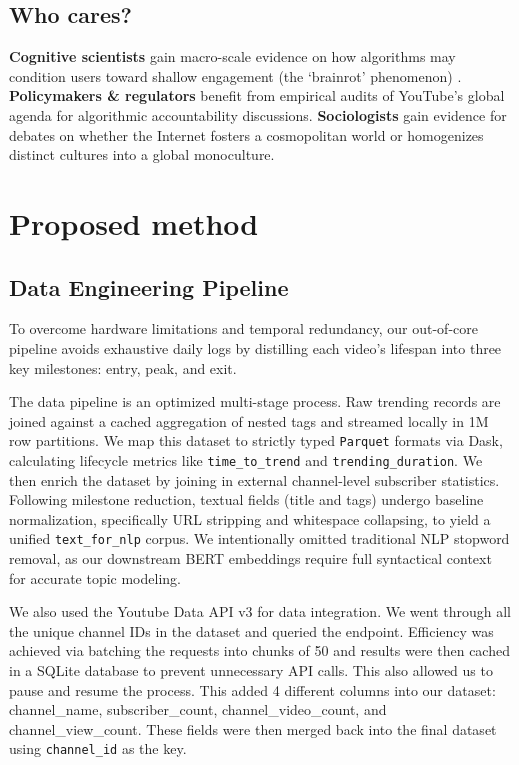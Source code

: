 \documentclass[sigconf,11pt]{acmart}
\begin{document}
\subsection{Who cares?}
\textbf{Cognitive scientists} gain macro-scale evidence on how algorithms may condition users toward shallow engagement (the `brainrot' phenomenon) \cite{10457053}. \textbf{Policymakers \& regulators} benefit from empirical audits of YouTube's global agenda for algorithmic accountability discussions. \textbf{Sociologists} gain evidence for debates on whether the Internet fosters a cosmopolitan world or homogenizes distinct cultures into a global monoculture.


\section{Proposed method}

\subsection{Data Engineering Pipeline}
To overcome hardware limitations and temporal redundancy, our out-of-core pipeline avoids exhaustive daily logs by distilling each video's lifespan into three key milestones: entry, peak, and exit. 

The data pipeline is an optimized multi-stage process. Raw trending records are joined against a cached aggregation of nested tags and streamed locally in 1M row partitions. We map this dataset to strictly typed \texttt{Parquet} formats via Dask, calculating lifecycle metrics like \texttt{time\_to\_trend} and \texttt{trending\_duration}. We then enrich the dataset by joining in external channel-level subscriber statistics. Following milestone reduction, textual fields (title and tags) undergo baseline normalization, specifically URL stripping and whitespace collapsing, to yield a unified \texttt{text\_for\_nlp} corpus. We intentionally omitted traditional NLP stopword removal, as our downstream BERT embeddings require full syntactical context for accurate topic modeling. 

We also used the Youtube Data API v3 for data integration. We went through all the unique channel IDs in the dataset and queried the endpoint. Efficiency was achieved via batching the requests into chunks of 50 and results were then cached in a SQLite database to prevent unnecessary API calls. This also allowed us to pause and resume the process. This added 4 different columns into our dataset: channel\_name, subscriber\_count, channel\_video\_count, and channel\_view\_count. These fields were then merged back into the final dataset using \texttt{channel\_id} as the key.
\end{document}
